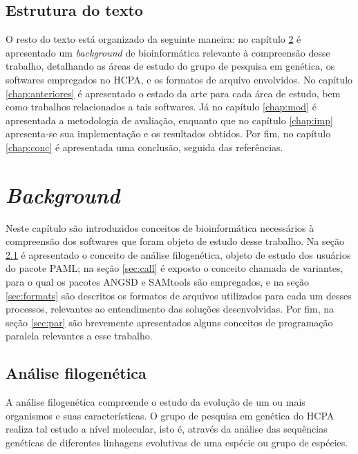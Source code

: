 \documentclass[cic,tc]{iiufrgs}
\begin{document}
%
%
\section{Estrutura do texto}

O resto do texto está organizado da seguinte maneira: no capítulo
\ref{chap:bg} é apresentado um \textit{background} de bioinformática relevante à
compreensão desse trabalho, detalhando as áreas de estudo do grupo de pesquisa
em genética, os softwares empregados no HCPA, e os formatos de arquivo
envolvidos. No capítulo \ref{chap:anteriores} é apresentado o estado da arte
para cada área de estudo, bem como trabalhos relacionados a tais softwares. Já
no capítulo \ref{chap:mod} é apresentada a metodologia de avaliação, enquanto
que no capítulo \ref{chap:imp} apresenta-se sua implementação e os resultados
obtidos.  Por fim, no capítulo \ref{chap:conc} é apresentada uma conclusão,
seguida das referências.

%
%
%
%

\chapter{\textit{Background}}
\label{chap:bg}

Neste capítulo são introduzidos conceitos de bioinformática necessários à
compreensão dos softwares que foram objeto de estudo desse trabalho.
Na seção \ref{sec:filo} é apresentado o conceito de análise filogenética,
objeto de estudo dos usuários do pacote PAML; na seção \ref{sec:call} é exposto
o conceito chamada de variantes, para o qual os pacotes ANGSD e SAMtools
são empregados, e na seção \ref{sec:formats} são descritos os formatos de
arquivos utilizados para cada um desses processos, relevantes ao entendimento
das soluções desenvolvidas. Por fim, na seção \ref{sec:par} são brevemente
apresentados alguns conceitos de programação paralela relevantes a esse
trabalho.

\section{Análise filogenética}
\label{sec:filo}

A análise filogenética compreende o estudo da evolução de um ou mais organismos
e suas características. O grupo de pesquisa em genética do HCPA realiza tal
estudo a nível molecular, isto é, através da análise das sequências genéticas
de diferentes linhagens evolutivas de uma espécie ou grupo de espécies.
\end{document}
